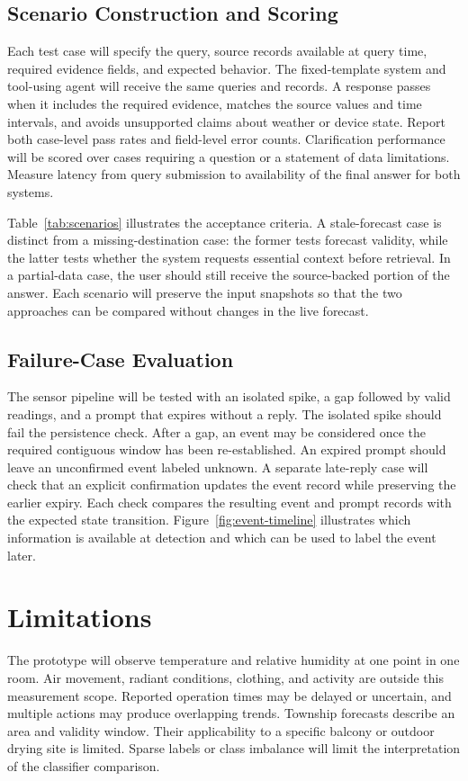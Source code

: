 \subsection{Scenario Construction and Scoring}
Each test case will specify the query, source records available at query time, required evidence fields, and expected behavior. The fixed-template system and tool-using agent will receive the same queries and records. A response passes when it includes the required evidence, matches the source values and time intervals, and avoids unsupported claims about weather or device state. Report both case-level pass rates and field-level error counts. Clarification performance will be scored over cases requiring a question or a statement of data limitations. Measure latency from query submission to availability of the final answer for both systems.

Table~\ref{tab:scenarios} illustrates the acceptance criteria. A stale-forecast case is distinct from a missing-destination case: the former tests forecast validity, while the latter tests whether the system requests essential context before retrieval. In a partial-data case, the user should still receive the source-backed portion of the answer. Each scenario will preserve the input snapshots so that the two approaches can be compared without changes in the live forecast.



\subsection{Failure-Case Evaluation}
The sensor pipeline will be tested with an isolated spike, a gap followed by valid readings, and a prompt that expires without a reply. The isolated spike should fail the persistence check. After a gap, an event may be considered once the required contiguous window has been re-established. An expired prompt should leave an unconfirmed event labeled unknown. A separate late-reply case will check that an explicit confirmation updates the event record while preserving the earlier expiry. Each check compares the resulting event and prompt records with the expected state transition. Figure~\ref{fig:event-timeline} illustrates which information is available at detection and which can be used to label the event later.



\section{Limitations}
The prototype will observe temperature and relative humidity at one point in one room. Air movement, radiant conditions, clothing, and activity are outside this measurement scope. Reported operation times may be delayed or uncertain, and multiple actions may produce overlapping trends. Township forecasts describe an area and validity window. Their applicability to a specific balcony or outdoor drying site is limited. Sparse labels or class imbalance will limit the interpretation of the classifier comparison.

